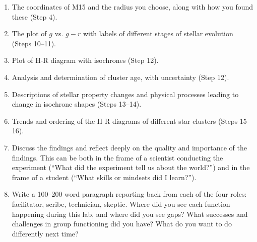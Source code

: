 \begin{enumerate}
	
	\item The coordinates of M15 and the radius you choose, along with how you found these (Step 4).
	
	\item The plot of $g$ vs. $g-r$ with labels of different stages of stellar evolution (Steps 10--11).
	
	\item Plot of H-R diagram with isochrones (Step 12).
	
	\item Analysis and determination of cluster age, with uncertainty (Step 12).
	
	\item Descriptions of stellar property changes and physical processes leading to change in isochrone shapes (Steps 13--14).
	
	\item Trends and ordering of the H-R diagrams of different star clusters (Steps 15--16).
	
	\item Discuss the findings and reflect deeply on the quality and importance of the findings. This can
	be both in the frame of a scientist conducting the experiment (“What did the experiment tell us
	about the world?”) and in the frame of a student (“What skills or mindsets did I learn?”).
	
	\item Write a 100--200 word paragraph reporting back from each of the four roles: facilitator, scribe, technician, skeptic. Where did you see each function happening during this lab, and where did you see gaps? What successes and challenges in group functioning did you have? What do you want to do differently next time?
\end{enumerate}